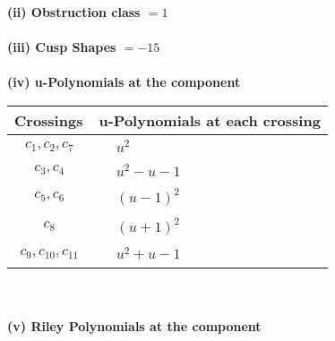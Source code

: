 \documentclass[1p]{elsarticle_modified}
\theoremstyle{definition}
\begin{document}
\flushleft \textbf{(ii) Obstruction class $= 1$}\\~\\
\flushleft \textbf{(iii) Cusp Shapes $= -15$}\\~\\
\newpage\renewcommand{\arraystretch}{1}
\flushleft \textbf{(iv) u-Polynomials at the component}\newline \\
\begin{tabular}{m{50pt}|m{274pt}}
Crossings & \hspace{64pt}u-Polynomials at each crossing \\
\hline $$\begin{aligned}c_{1},c_{2},c_{7}\end{aligned}$$&$\begin{aligned}
&u^2
\end{aligned}$\\
\hline $$\begin{aligned}c_{3},c_{4}\end{aligned}$$&$\begin{aligned}
&u^2- u-1
\end{aligned}$\\
\hline $$\begin{aligned}c_{5},c_{6}\end{aligned}$$&$\begin{aligned}
&(u-1)^2
\end{aligned}$\\
\hline $$\begin{aligned}c_{8}\end{aligned}$$&$\begin{aligned}
&(u+1)^2
\end{aligned}$\\
\hline $$\begin{aligned}c_{9},c_{10},c_{11}\end{aligned}$$&$\begin{aligned}
&u^2+u-1
\end{aligned}$\\
\hline
\end{tabular}\\~\\
\newpage\renewcommand{\arraystretch}{1}
\flushleft \textbf{(v) Riley Polynomials at the component}\newline \\
\end{document}

